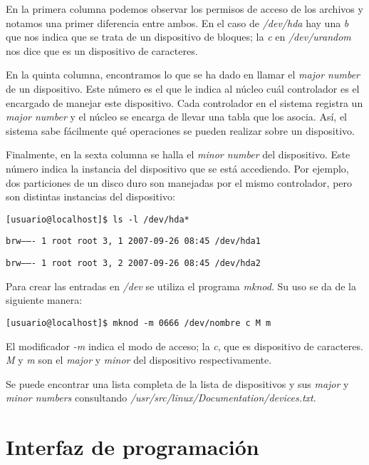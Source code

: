 \documentclass[12pt,a4paper,spanish]{article}
\begin{document}
En la primera columna podemos observar los permisos de acceso de los archivos y notamos una primer diferencia entre ambos. En el caso de \textit{/dev/hda} hay una \textit{b} que nos indica que se trata de un dispositivo de bloques; la \textit{c} en \textit{/dev/urandom} nos dice que es un dispositivo de caracteres.

En la quinta columna, encontramos lo que se ha dado en llamar el \textit{major number} de un dispositivo. Este número es el que le indica al núcleo cuál controlador es el encargado de manejar este dispositivo. Cada controlador en el sistema registra un \textit{major number} y el núcleo se encarga de llevar una tabla que los asocia. Así, el sistema sabe fácilmente qué operaciones se pueden realizar sobre un dispositivo.

Finalmente, en la sexta columna se halla el \textit{minor number} del dispositivo. Este número indica la instancia del dispositivo que se está accediendo. Por ejemplo, dos particiones de un disco duro son manejadas por el mismo controlador, pero son distintas instancias del dispositivo:

\begin{flushleft}
\texttt{[usuario@localhost]\$ ls -l /dev/hda*}

\texttt{brw-------    1 root     root       3,   1 2007-09-26 08:45 /dev/hda1}

\texttt{brw-------    1 root     root       3,   2 2007-09-26 08:45 /dev/hda2}
\end{flushleft} 

Para crear las entradas en \textit{/dev} se utiliza el programa \textit{mknod}. Su uso se da de la siguiente ma\-ne\-ra:

\begin{flushleft} 
\texttt{[usuario@localhost]\$ mknod -m 0666 /dev/nombre c M m}
\end{flushleft} 

El modificador \textit{-m} indica el modo de acceso; la \textit{c}, que es dispositivo de caracteres. \textit{M} y \textit{m} son el \textit{major} y \textit{minor}  del dispositivo respectivamente.

Se puede encontrar una lista completa de la lista de dispositivos y sus \textit{major} y \textit{minor numbers} consultando \textit{/usr/src/linux/Documentation/devices.txt}.

\section{Interfaz de programación}
\end{document}
